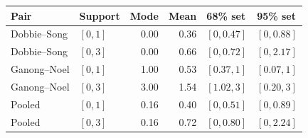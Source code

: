 \begin{tabular}{llrrll}
\toprule
Pair & Support & Mode & Mean & 68\% set & 95\% set \\
\midrule
Dobbie--Song & $[0, 1]$ & 0.00 & 0.36 & $[0, 0.47]$ & $[0, 0.88]$ \\
Dobbie--Song & $[0, 3]$ & 0.00 & 0.66 & $[0, 0.72]$ & $[0, 2.17]$ \\
Ganong--Noel & $[0, 1]$ & 1.00 & 0.53 & $[0.37, 1]$ & $[0.07, 1]$ \\
Ganong--Noel & $[0, 3]$ & 3.00 & 1.54 & $[1.02, 3]$ & $[0.20, 3]$ \\
Pooled & $[0, 1]$ & 0.16 & 0.40 & $[0, 0.51]$ & $[0, 0.89]$ \\
Pooled & $[0, 3]$ & 0.16 & 0.72 & $[0, 0.80]$ & $[0, 2.24]$ \\
\bottomrule
\end{tabular}
